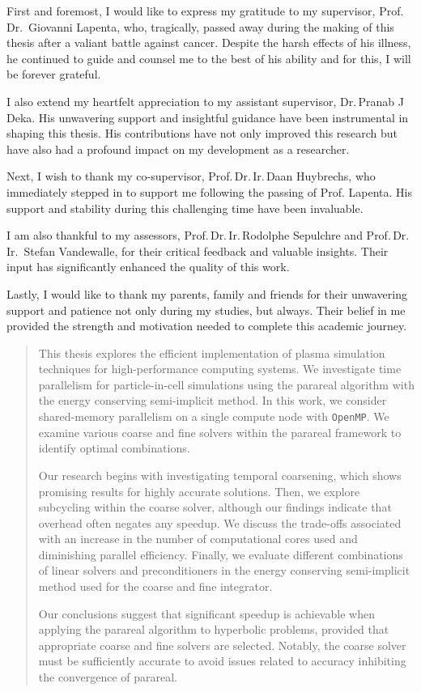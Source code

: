\documentclass[master=wit, english]{kulemt}
\begin{document}
\begin{preface}
 First and foremost, I would like to express my gratitude to my supervisor, Prof.\,Dr.\, Giovanni Lapenta, who, tragically, passed away during the making of this thesis after a valiant battle against cancer. Despite the harsh effects of his illness, he continued to guide and counsel me to the best of his ability and for this, I will be forever grateful.
 
I also extend my heartfelt appreciation to my assistant supervisor, Dr.\,Pranab J Deka. His unwavering support and insightful guidance have been instrumental in shaping this thesis. His contributions have not only improved this research but have also had a profound impact on my development as a researcher.
 
 Next, I wish to thank my co-supervisor, Prof.\,Dr.\,Ir.\,Daan Huybrechs, who immediately stepped in to support me following the passing of Prof. Lapenta. His support and stability during this challenging time have been invaluable. 
 
I am also thankful to my assessors, Prof.\,Dr.\,Ir.\,Rodolphe Sepulchre and Prof.\,Dr.\,Ir.\, Stefan Vandewalle, for their critical feedback and valuable insights. Their input has significantly enhanced the quality of this work.
 
 Lastly, I would like to thank my parents, family and friends for their unwavering support and patience not only during my studies, but always. Their belief in me provided the strength and motivation needed to complete this academic journey.
 
\end{preface}

\tableofcontents*

\begin{abstract}
This thesis explores the efficient implementation of plasma simulation techniques for high-performance computing systems. We investigate time parallelism for particle-in-cell simulations using the parareal algorithm with the energy conserving semi-implicit method. In this work, we consider shared-memory parallelism on a single compute node with \texttt{OpenMP}. We examine various coarse and fine solvers within the parareal framework to identify optimal combinations.

Our research begins with investigating temporal coarsening, which shows promising results for highly accurate solutions. Then, we explore subcycling within the coarse solver, although our findings indicate that overhead often negates any speedup. We discuss the trade-offs associated with an increase in the number of computational cores used and diminishing parallel efficiency. Finally, we evaluate different combinations of linear solvers and preconditioners in the energy conserving semi-implicit method used for the coarse and fine integrator.

Our conclusions suggest that significant speedup is achievable when applying the parareal algorithm to hyperbolic problems, provided that appropriate coarse and fine solvers are selected. Notably, the coarse solver must be sufficiently accurate to avoid issues related to accuracy inhibiting the convergence of parareal. 
\end{abstract}
\end{document}
